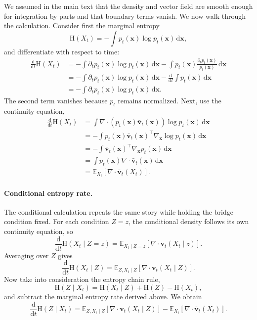\documentclass{article}
\newcommand{\E}{\mathbb{E}}
\newcommand{\Ent}{\mathrm{H}}
\newcommand{\dd}{\mathrm{d}}
\newcommand{\vx}{\bm{x}}
\newcommand{\vv}{\bm{v}}
\newcommand{\diver}{\nabla\!\cdot}
\theoremstyle{plain}
\theoremstyle{definition}
\theoremstyle{remark}
\begin{document}
We assumed in the main text that the density and vector field are smooth enough for integration by parts and that boundary terms vanish. We now walk through the calculation. Consider first the marginal entropy
\begin{equation}
  \Ent(X_t)=-\int p_t(\vx)\log p_t(\vx)\,\dd \vx,
\end{equation}
and differentiate with respect to time:
\begin{align}
  \frac{\dd}{\dd t}\Ent(X_t)
  &=
  -\int \partial_t p_t(\vx)\log p_t(\vx)\,\dd\vx
  -\int p_t(\vx)\frac{\partial_t p_t(\vx)}{p_t(\vx)}\,\dd\vx \\
  &=
  -\int \partial_t p_t(\vx)\log p_t(\vx)\,\dd\vx
  -\frac{\dd}{\dd t}\int p_t(\vx)\,\dd\vx \\
  &=
  -\int \partial_t p_t(\vx)\log p_t(\vx)\,\dd\vx.
\end{align}
The second term vanishes because $p_t$ remains normalized. Next, use the continuity equation,
\begin{align}
  \frac{\dd}{\dd t}\Ent(X_t)
  &=
  \int \diver(p_t(\vx)\bar{\vv}_t(\vx))\log p_t(\vx)\,\dd\vx \\
  &=
  -\int p_t(\vx)\bar{\vv}_t(\vx)^\top \nabla_{\vx}\log p_t(\vx)\,\dd\vx \\
  &=
  -\int \bar{\vv}_t(\vx)^\top \nabla_{\vx}p_t(\vx)\,\dd\vx \\
  &=
  \int p_t(\vx)\diver \bar{\vv}_t(\vx)\,\dd\vx \\
  &=
  \E_{X_t}\!\left[\diver\bar{\vv}_t(X_t)\right].
\end{align}

\paragraph{Conditional entropy rate.}
\label{app:conditional_entropy}

The conditional calculation repeats the same story while holding the bridge condition fixed. For each condition $Z=z$, the conditional density follows its own continuity equation, so
\begin{equation}
  \frac{\dd}{\dd t}\Ent(X_t\mid Z=z)
  =
  \E_{X_t\mid Z=z}\!\left[\diver \vv_t(X_t\mid z)\right].
\end{equation}
Averaging over $Z$ gives
\begin{equation}
  \frac{\dd}{\dd t}\Ent(X_t\mid Z)
  =
  \E_{Z,X_t\mid Z}\!\left[\diver \vv_t(X_t\mid Z)\right].
\end{equation}
Now take into consideration the entropy chain rule,
\begin{equation}
  \Ent(Z\mid X_t)=\Ent(X_t\mid Z)+\Ent(Z)-\Ent(X_t),
\end{equation}
and subtract the marginal entropy rate derived above. We obtain
\begin{equation}
  \frac{\dd}{\dd t}\Ent(Z\mid X_t)
  =
  \E_{Z,X_t\mid Z}\!\left[\diver \vv_t(X_t\mid Z)\right]
  -
  \E_{X_t}\!\left[\diver \bar{\vv}_t(X_t)\right].
\end{equation}
\end{document}
